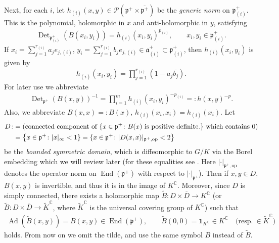 \documentclass[pdftex]{sigma}
\numberwithin{equation}{section}
\newcommand{\bone}{\mathbf{1}}
\newcommand{\BC}{\mathbb{C}}
\newcommand{\fa}{\mathfrak{a}}
\newcommand{\fp}{\mathfrak{p}}
\newcommand{\cP}{\mathcal{P}}
\newcommand{\End}{\operatorname{End}}
\newcommand{\Det}{\operatorname{Det}}
\begin{document}
Next, for each $i$, let $h_{(i)}(x,y)\in\cP(\fp^+\times\overline{\fp^+})$ be the \textit{generic norm} on $\fp^+_{(i)}$.
This is the polynomial, holomorphic in $x$ and anti-holomorphic in $y$, satisfying
\begin{gather*} \Det_{\fp^+_{(i)}}(B(x_i,y_i))=h_{(i)}(x_i,y_i)^{p_{(i)}}, \qquad x_i,y_i\in\fp^+_{(i)} . \end{gather*}
If $x_i=\sum\limits_{j=1}^{r_{(i)}}a_je_{j,(i)}$, $y_i=\sum\limits_{j=1}^{r_{(i)}}b_je_{j,(i)}\in\fa^+_{(i)}\subset\fp^+_{(i)}$,
then $h_{(i)}(x_i,y_i)$ is given by
\begin{gather*} h_{(i)}(x_i,y_i)=\prod_{j=1}^{r_{(i)}}(1-a_j\overline{b_j}). \end{gather*}
For later use we abbreviate
\begin{gather*} \Det_{\fp^+}(B(x,y))^{-1}=\prod_{i=1}^m h_{(i)}(x_i,y_i)^{-p_{(i)}}=:h(x,y)^{-p}. \end{gather*}
Also, we abbreviate $B(x,x)=:B(x)$, $h_{(i)}(x_i,x_i)=h_{(i)}(x_i)$. Let
\begin{align}
D\colon \hspace{-3pt}&=(\text{connected component of }\{x\in \fp^+\colon B(x)\text{ is positive definite.}\}\text{ which contains }0) \notag \\
&=\big\{x\in \fp^+\colon |x|_\infty <1\}=\{x\in \fp^+\colon |D(x,x)|_{\fp^+,\mathrm{op}}<2\big\}\label{BSD}
\end{align}
be the \textit{bounded symmetric domain}, which is diffeomorphic to $G/K$ via the Borel embedding which we will review later
(for these equalities see \cite[Part~V, Proposition~VI.4.2]{FKKLR}. Here $|\cdot|_{\fp^+,\mathrm{op}}$ denotes the
operator norm on $\End(\fp^+)$ with respect to $|\cdot|_{\fp^+}$).
Then if $x,y\in D$, $B(x,y)$ is invertible, and thus it is in the image of $K^\BC$.
Moreover, since $D$ is simply connected, there exists a holomorphic map $\tilde{B}\colon D\times\overline{D}\to K^\BC$
(or $\tilde{B}\colon D\times\overline{D}\to \tilde{K}^\BC$, where $\tilde{K}^\BC$ is the universal covering group of $K^\BC$)
such that
\begin{gather*} \operatorname{Ad}(\tilde{B}(x,y))=B(x,y)\in\End(\fp^+), \qquad \tilde{B}(0,0)=\bone_{K^\BC}\in K^\BC \quad \big(\text{resp.} \ {} \in \tilde{K}^\BC\big) \end{gather*}
holds. From now on we omit the tilde, and use the same symbol $B$ instead of $\tilde{B}$.
\end{document}
